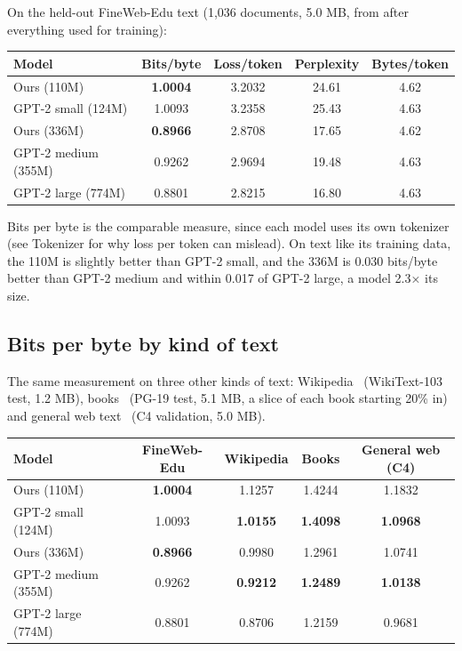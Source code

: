 \documentclass[11pt]{article}
\begin{document}
On the held-out FineWeb-Edu text (1,036 documents, 5.0 MB, from after everything used for training):

\begin{center}
\small
\begin{tabular}{lcccc}
\toprule
\textbf{Model} & \textbf{Bits/\allowbreak{}byte} & \textbf{Loss/\allowbreak{}token} & \textbf{Perplexity} & \textbf{Bytes/\allowbreak{}token} \\
\midrule
Ours (110M) & \textbf{1.0004} & 3.2032 & 24.61 & 4.62 \\
GPT-2 small (124M) & 1.0093 & 3.2358 & 25.43 & 4.63 \\
Ours (336M) & \textbf{0.8966} & 2.8708 & 17.65 & 4.62 \\
GPT-2 medium (355M) & 0.9262 & 2.9694 & 19.48 & 4.63 \\
GPT-2 large (774M) & 0.8801 & 2.8215 & 16.80 & 4.63 \\
\bottomrule
\end{tabular}
\end{center}

Bits per byte is the comparable measure, since each model uses its own tokenizer (see Tokenizer for why loss per token can mislead). On text like its training data, the 110M is slightly better than GPT-2 small, and the 336M is 0.030 bits/\allowbreak{}byte better than GPT-2 medium and within 0.017 of GPT-2 large, a model 2.3× its size.

\subsection{Bits per byte by kind of text}

The same measurement on three other kinds of text: Wikipedia~\citep{merity2017wikitext} (WikiText-103 test, 1.2 MB), books~\citep{rae2020pg19} (PG-19 test, 5.1 MB, a slice of each book starting 20\% in) and general web text~\citep{raffel2020c4} (C4 validation, 5.0 MB).

\begin{center}
\small
\begin{tabular}{lcccc}
\toprule
\textbf{Model} & \textbf{FineWeb-Edu} & \textbf{Wikipedia} & \textbf{Books} & \textbf{General web (C4)} \\
\midrule
Ours (110M) & \textbf{1.0004} & 1.1257 & 1.4244 & 1.1832 \\
GPT-2 small (124M) & 1.0093 & \textbf{1.0155} & \textbf{1.4098} & \textbf{1.0968} \\
Ours (336M) & \textbf{0.8966} & 0.9980 & 1.2961 & 1.0741 \\
GPT-2 medium (355M) & 0.9262 & \textbf{0.9212} & \textbf{1.2489} & \textbf{1.0138} \\
GPT-2 large (774M) & 0.8801 & 0.8706 & 1.2159 & 0.9681 \\
\bottomrule
\end{tabular}
\end{center}
\end{document}
